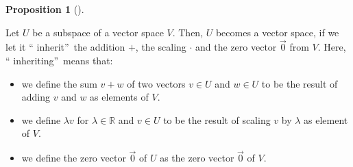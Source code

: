 \documentclass[numbers=enddot,12pt,final,onecolumn,notitlepage]{scrartcl}%
\theoremstyle{definition}
\newtheorem{prop}[theo]{Proposition}
\newenvironment{proposition}[1][]
{\begin{prop}[#1]\begin{leftbar}}
{\end{leftbar}\end{prop}}
\begin{document}
\begin{proposition}
\label{prop.subspace.space}Let $U$ be a subspace of a vector space $V$. Then,
$U$ becomes a vector space, if we let it \textquotedblleft
inherit\textquotedblright\ the addition $+$, the scaling $\cdot$ and the zero
vector $\overrightarrow{0}$ from $V$. Here, \textquotedblleft
inheriting\textquotedblright\ means that:

\begin{itemize}
\item we define the sum $v+w$ of two vectors $v\in U$ and $w\in U$ to be the
result of adding $v$ and $w$ as elements of $V$.

\item we define $\lambda v$ for $\lambda\in\mathbb{R}$ and $v\in U$ to be the
result of scaling $v$ by $\lambda$ as element of $V$.

\item we define the zero vector $\overrightarrow{0}$ of $U$ as the zero vector
$\overrightarrow{0}$ of $V$.
\end{itemize}
\end{proposition}
\end{document}
